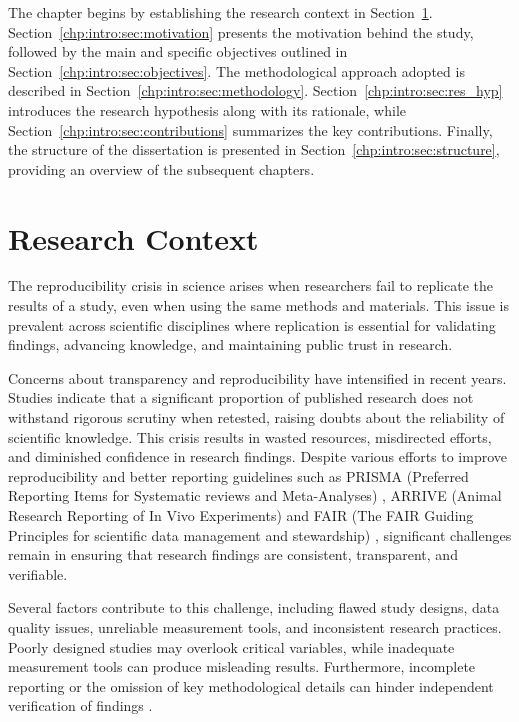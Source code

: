\documentclass[final]{rc-book-2.14}
\begin{document}
The chapter begins by establishing the research context in Section~\ref{chp:intro:sec:context}. Section~\ref{chp:intro:sec:motivation} presents the motivation behind the study, followed by the main and specific objectives outlined in Section~\ref{chp:intro:sec:objectives}. The methodological approach adopted is described in Section~\ref{chp:intro:sec:methodology}. Section~\ref{chp:intro:sec:res_hyp} introduces the research hypothesis along with its rationale, while Section~\ref{chp:intro:sec:contributions} summarizes the key contributions. Finally, the structure of the dissertation is presented in Section~\ref{chp:intro:sec:structure}, providing an overview of the subsequent chapters.



\newpage


\section{Research Context}
\label{chp:intro:sec:context}


The reproducibility crisis in science arises when researchers fail to replicate the results of a study, even when using the same methods and materials. This issue is prevalent across scientific disciplines where replication is essential for validating findings, advancing knowledge, and maintaining public trust in research.

Concerns about transparency and reproducibility have intensified in recent years. Studies indicate that a significant proportion of published research does not withstand rigorous scrutiny when retested, raising doubts about the reliability of scientific knowledge. This crisis results in wasted resources, misdirected efforts, and diminished confidence in research findings. Despite various efforts to improve reproducibility and better reporting guidelines such as PRISMA (Preferred Reporting Items for Systematic reviews and Meta-Analyses) \cite{Pagen71}, ARRIVE (Animal Research Reporting of In Vivo Experiments) \cite{percie2020arrive} and FAIR (The FAIR Guiding Principles for scientific data management and stewardship) \cite{wilkinson2016fair}, significant challenges remain in ensuring that research findings are consistent, transparent, and verifiable.

Several factors contribute to this challenge, including flawed study designs, data quality issues, unreliable measurement tools, and inconsistent research practices. Poorly designed studies may overlook critical variables, while inadequate measurement tools can produce misleading results. Furthermore, incomplete reporting or the omission of key methodological details can hinder independent verification of findings \cite{freedman_economics_2015}.
\end{document}
